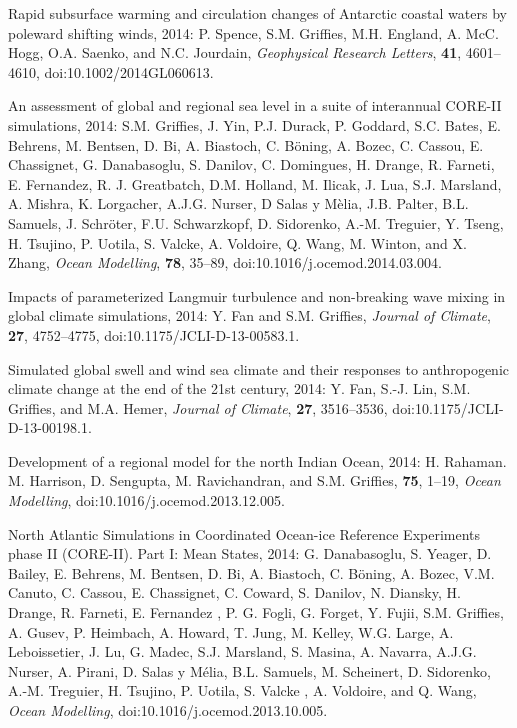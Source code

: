 \begin{etaremune}
\item Rapid subsurface warming and circulation changes of Antarctic coastal waters by poleward shifting winds, 2014: P. Spence, S.M. Grif\/f\/ies, M.H. England, A. McC. Hogg, O.A. Saenko, and N.C. Jourdain, {\it Geophysical Research Letters}, {\bf 41}, 4601--4610, doi:10.1002/2014GL060613.

\item An assessment of global and regional sea level in a suite of interannual CORE-II simulations, 2014: S.M. Grif\/f\/ies, J. Yin, P.J. Durack, P. Goddard, S.C. Bates, E. Behrens, M. Bentsen,  D. Bi, A. Biastoch, C. B\"oning, A. Bozec, C. Cassou, E. Chassignet,
  G. Danabasoglu, S. Danilov, C. Domingues, H. Drange, R. Farneti,  E. Fernandez, R. J. Greatbatch, D.M. Holland, M. Ilicak, J. Lua,
  S.J. Marsland, A. Mishra, K. Lorgacher, A.J.G. Nurser, D Salas y  M\`elia, J.B.  Palter, B.L. Samuels, J. Schr\"oter, F.U. Schwarzkopf, D. Sidorenko, A.-M. Treguier, Y. Tseng,  H. Tsujino, P. Uotila, S. Valcke, A. Voldoire, Q. Wang, M. Winton,  and X. Zhang, {\it Ocean Modelling}, {\bf 78}, 35--89,
  doi:10.1016/j.ocemod.2014.03.004.

\item Impacts of parameterized Langmuir turbulence and non-breaking wave mixing in global climate simulations, 2014: Y. Fan and S.M. Grif\/f\/ies, {\it Journal of Climate}, {\bf 27},  4752--4775, doi:10.1175/JCLI-D-13-00583.1.

\item Simulated global swell and wind sea climate and their responses to anthropogenic climate change at the end of the 21st century,  2014: Y. Fan, S.-J. Lin, S.M. Grif\/f\/ies, and M.A. Hemer, {\it Journal of Climate}, {\bf 27}, 3516--3536, doi:10.1175/JCLI-D-13-00198.1.

\item Development of a regional model for the north Indian Ocean, 2014: H. Rahaman. M. Harrison, D. Sengupta, M.  Ravichandran, and S.M. Grif\/f\/ies, {\bf 75}, 1--19, {\it Ocean Modelling}, doi:10.1016/j.ocemod.2013.12.005.

\item North Atlantic Simulations in Coordinated Ocean-ice Reference Experiments phase II (CORE-II). Part I: Mean States, 2014: G. Danabasoglu, S. Yeager, D. Bailey, E. Behrens, M. Bentsen, D. Bi, A. Biastoch, C. {B\"{o}ning}, A. Bozec, V.M. Canuto, C. Cassou, E. Chassignet, C. Coward, S. Danilov, N. Diansky, H. Drange, R. Farneti, E. Fernandez , P. G. Fogli, G. Forget, Y. Fujii, S.M. Grif\/f\/ies, A.  Gusev, P. Heimbach, A.  Howard, T. Jung,  M. Kelley, W.G. Large, A. Leboissetier, J. Lu, G. Madec, S.J. Marsland, S. Masina, A. Navarra, A.J.G. Nurser, A. Pirani, D. Salas y {M\'{e}lia}, B.L. Samuels, M. Scheinert, D. Sidorenko, A.-M. Treguier, H. Tsujino, P.   Uotila, S. Valcke , A. Voldoire, and Q. Wang, {\it Ocean Modelling}, doi:10.1016/j.ocemod.2013.10.005.


\end{etaremune}
